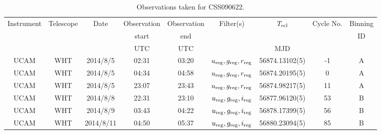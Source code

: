\begin{table}
	\begin{center}
		\caption{Observations taken for CSS090622.}
		\label{table:observing:observation logs CSS090622}
		\begin{tabular}{ccccccccc}
			\hline
			Instrument & Telescope & Date & Observation  & Observation  & Filter(s) & $T_{\rm ecl}$ & Cycle No. & Binning \\
			 &  &  &  start &  end &  &  &  & ID \\
			 &  &  & UTC & UTC &  & MJD &  &  \\
			\hline
			\hline
			UCAM & WHT & 2014/8/5  & 02:31 & 03:20 & $u_{\rm reg},g_{\rm reg},r_{\rm reg}$ & 56874.13102(5) & -1 & A \\
			UCAM & WHT & 2014/8/5  & 04:34 & 04:58 & $u_{\rm reg},g_{\rm reg},r_{\rm reg}$ & 56874.20195(5) &  0 & A \\
			UCAM & WHT & 2014/8/5  & 23:07 & 23:43 & $u_{\rm reg},g_{\rm reg},r_{\rm reg}$ & 56874.98217(5) & 11 & A \\
			UCAM & WHT & 2014/8/8  & 22:31 & 23:10 & $u_{\rm reg},g_{\rm reg},i_{\rm reg}$ & 56877.96120(5) & 53 & B \\
			UCAM & WHT & 2014/8/9  & 03:43 & 04:22 & $u_{\rm reg},g_{\rm reg},i_{\rm reg}$ & 56878.17399(5) & 56 & B \\
			UCAM & WHT & 2014/8/11 & 04:50 & 05:37 & $u_{\rm reg},g_{\rm reg},i_{\rm reg}$ & 56880.23094(5) & 85 & B \\
		   \hline
		\end{tabular}
	\end{center}
\end{table}